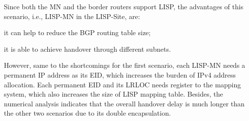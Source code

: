 Since both the MN and the border routers support LISP, the advantages of this scenario, i.e., LISP-MN in the LISP-Site, are: 
\begin{inparaenum}[1)]
	\item it can help to reduce the BGP routing table size;
	\item it is able to achieve handover through different subnets.
\end{inparaenum}
However, same to the shortcomings for the first scenario, each LISP-MN needs a permanent IP address as its EID, which increases the burden of IPv4 address allocation. Each permanent EID and its LRLOC needs register to the mapping system, which also increases the size of LISP mapping table. Besides, the numerical analysis indicates that the overall handover delay is much longer than the other two scenarios due to its double encapsulation.

